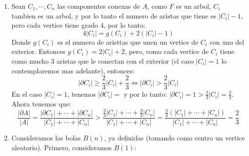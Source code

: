 \documentclass{article}
\begin{document}
\begin{enumerate}
\begin{enumerate}
 \item Sean $C_1, \cdots, C_n$ las componentes conexas de $A$, como $F$ es un arbol, $C_i$
 tambien es un arbol, y por lo tanto el numero de aristas que tiene es $\lvert C_i \rvert -1$, pero cada
 vertice tiene grado 4, por lo tanto:
 \[
 4 \lvert C_i \rvert = g(C_i) + 2(\lvert C_i \rvert -1)
 \]
 Donde $g(C_i)$ es el numero de aristtas que unen un vertice de $C_i$ con uno del exterior. Entonces
 $g(C_i) = 2 \lvert C_i \rvert + 2$, pero, como cada vertice de $C_i$ tiene como mucho 3 aristas que le
 conectan con el exterior (el caso $\lvert C_i \rvert = 1$ lo contemplaremos mas adelante), entonces:
 \[
 \lvert \partial C_i \rvert \geq \frac{2}{3}\lvert C_i \rvert + \frac{2}{3}
 \iff
\lvert \partial C_i \rvert >\frac{2}{3}\lvert C_i \rvert
 \]
 En el caso $\lvert C_i \rvert = 1$, tenemos $\lvert \partial C_i \rvert = $ y por lo tanto:
 $\lvert \partial C_i \rvert = 1 > \frac{2}{3}\lvert C_i \rvert = \frac{2}{3}$. Ahora tenemos que:
 \[
 \frac{\lvert \partial A \rvert}{\lvert A \rvert} =
 \frac{\lvert \partial C_1 \rvert + \cdots + \lvert \partial C_n \rvert}
 {\lvert C_1 \rvert + \cdots + \lvert C_n \rvert} >
 \frac{\frac{2}{3}\lvert C_1 \rvert + \cdots + \frac{2}{3}\lvert C_n \rvert}
 {\lvert C_1 \rvert + \cdots + \lvert C_n \rvert } =
 \frac{\frac{2}{3} \left( \lvert C_1 \rvert + \cdots + \lvert C_n \rvert \right)}
 {\lvert C_1 \rvert + \cdots + \lvert C_n \rvert } = \frac{2}{3}
 \]
 
 \item Consideramos las bolas $B(n)$, ya definidas (tomando como centro un vertice aleatorio).
 Primero, consideramos $B(1)$:
 

\end{enumerate}
\end{enumerate}
\end{document}
